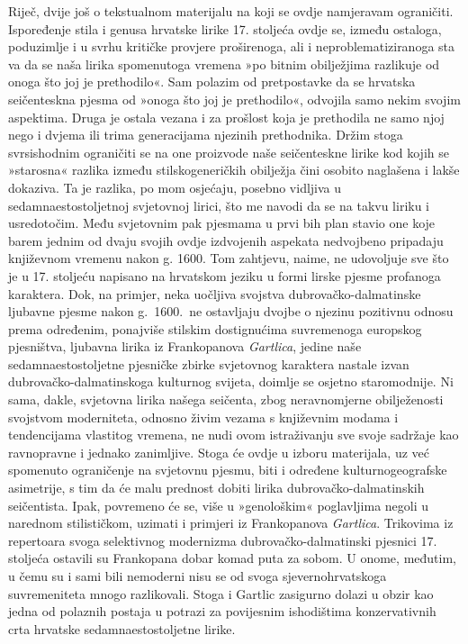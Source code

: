 \documentclass[a4paper,12pt,twoside]{report}
\begin{document}
Riječ, dvije još o tekstualnom materijalu na koji se ovdje namjeravam ograničiti. Ispoređenje stila i genusa hrvatske lirike 17. stoljeća ovdje se, između ostaloga, poduzimlje i u svrhu kritičke provjere proširenoga, ali i neproblematiziranoga sta va da se naša lirika spomenutoga vremena »po bitnim obilježjima razlikuje od onoga što joj je prethodilo«. Sam polazim od pretpostavke da se hrvatska seičenteskna pjesma od »onoga što joj je prethodilo«, odvojila samo nekim svojim aspektima. Druga je ostala vezana i za prošlost koja je prethodila ne samo njoj nego i dvjema ili trima generacijama njezinih prethodnika. Držim stoga svrsishodnim ograničiti se na one proizvode naše seičenteskne lirike kod kojih se »starosna« razlika između stilskogeneričkih obilježja čini osobito naglašena i lakše dokaziva. Ta je razlika, po mom osjećaju, posebno vidljiva u sedamnaestostoljetnoj svjetovnoj lirici, što me navodi da se na takvu liriku i usredotočim. Među svjetovnim pak pjesmama u prvi bih plan stavio one koje barem jednim od dvaju svojih ovdje izdvojenih aspekata nedvojbeno pripadaju književnom vremenu nakon g. 1600. Tom zahtjevu, naime, ne udovoljuje sve što je u 17. stoljeću napisano na hrvatskom jeziku u formi lirske pjesme profanoga karaktera. Dok, na primjer, neka uočljiva svojstva dubrovačko-dalmatinske ljubavne pjesme nakon g.~1600.\ ne ostavljaju dvojbe o njezinu pozitivnu odnosu prema određenim, ponajviše stilskim dostignućima suvremenoga europskog pjesništva, ljubavna lirika iz Frankopanova \textit{Gartlica}, jedine naše sedamnaestostoljetne pjesničke zbirke svjetovnog karaktera nastale izvan dubrovačko-dalmatinskoga kulturnog svijeta, doimlje se osjetno staromodnije. Ni sama, dakle, svjetovna lirika našega seičenta, zbog neravnomjerne obilježenosti svojstvom moderniteta, odnosno živim vezama s književnim modama i tendencijama vlastitog vremena, ne nudi ovom istraživanju sve svoje sadržaje kao ravnopravne i jednako zanimljive. Stoga će ovdje u izboru materijala, uz već spomenuto ograničenje na svjetovnu pjesmu, biti i određene kulturnogeografske asimetrije, s tim da će malu prednost dobiti lirika dubrovačko-dalmatinskih seičentista. Ipak, povremeno će se, više u »genološkim« poglavljima negoli u narednom stilističkom, uzimati i primjeri iz Frankopanova \textit{Gartlica}. Trikovima iz repertoara svoga selektivnog modernizma dubrovačko-dalmatinski pjesnici 17. stoljeća ostavili su Frankopana dobar komad puta za sobom. U onome, međutim, u čemu su i sami bili nemoderni nisu se od svoga sjevernohrvatskoga suvremeniteta mnogo razlikovali. Stoga i Gartlic zasigurno dolazi u obzir kao jedna od polaznih postaja u potrazi za povijesnim ishodištima konzervativnih crta hrvatske sedamnaestostoljetne lirike.
\end{document}
